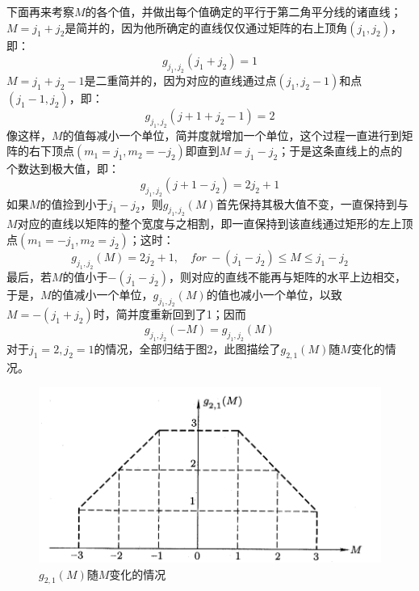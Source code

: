 \documentclass[]{article}
\begin{document}
下面再来考察$M$的各个值，并做出每个值确定的平行于第二角平分线的诸直线；$M=j_1+j_2$是简并的，因为他所确定的直线仅仅通过矩阵的右上顶角$(j_1,j_2)$，即：
\begin{equation}
	g_{j_1,j_2}(j_1+j_2)=1
	\label{c27c27}
\end{equation}
$M=j_1+j_2-1$是二重简并的，因为对应的直线通过点$(j_1,j_2-1)$和点$(j_1-1,j_2)$，即：
\begin{equation}
	g_{j_1,j_2}(j+1+j_2-1)=2
	\label{c28c28}
\end{equation}
像这样，$M$的值每减小一个单位，简并度就增加一个单位，这个过程一直进行到矩阵的右下顶点$(m_1=j_1,m_2=-j_2)$即直到$M=j_1-j_2$；于是这条直线上的点的个数达到极大值，即：
\begin{equation}
	g_{j_1,j_2}(j+1-j_2)=2j_2+1
\end{equation}
如果$M$的值捡到小于$j_1-j_2$，则$g_{j_1,j_2}(M)$首先保持其极大值不变，一直保持到与$M$对应的直线以矩阵的整个宽度与之相割，即一直保持到该直线通过矩形的左上顶点$(m_1=-j_1,m_2=j_2)$；这时：
\begin{equation}
	g_{j_1,j_2}(M)=2j_2+1,\quad for \  -(j_1-j_2)\leqslant M\leqslant j_1-j_2
	\label{c30c30}
\end{equation}
最后，若$M$的值小于$-(j_1-j_2)$，则对应的直线不能再与矩阵的水平上边相交，于是，$M$的值减小一个单位，$g_{j_1,j_2}(M)$的值也减小一个单位，以致$M=-(j_1+j_2)$时，简并度重新回到了1；因而
\begin{equation}
	g_{j_1,j_2}(-M)=g_{j_1,j_2}(M)
\end{equation}
对于$j_1=2,j_2=1$的情况，全部归结于图2，此图描绘了$g_{2,1}(M)$随$M$变化的情况。
\begin{figure}[H]
	\centering
	\includegraphics[scale=0.6]{2.png}
	\caption{$g_{2,1}(M)$随$M$变化的情况}
	\label{Figure 2}
\end{figure}
\end{document}
